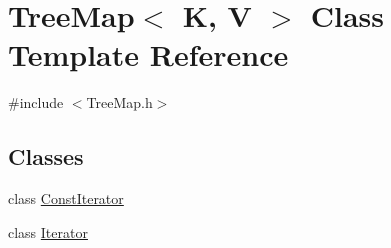 \hypertarget{class_tree_map}{
\section{TreeMap$<$ K, V $>$ Class Template Reference}
\label{class_tree_map}
}


{\ttfamily \#include $<$TreeMap.h$>$}

\subsection*{Classes}
\begin{DoxyCompactItemize}
\item 
class \hyperlink{class_tree_map_1_1_const_iterator}{ConstIterator}
\item 
class \hyperlink{class_tree_map_1_1_iterator}{Iterator}
\end{DoxyCompactItemize}
